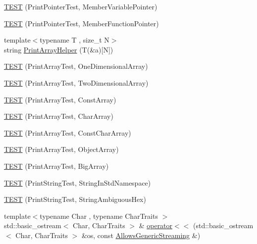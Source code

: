 \begin{DoxyCompactItemize}
\hyperlink{namespacetesting_1_1gtest__printers__test_a434cafcc1dbee409992bbb1593034480}{\-T\-E\-S\-T} (\-Print\-Pointer\-Test, \-Member\-Variable\-Pointer)
\item 
\hyperlink{namespacetesting_1_1gtest__printers__test_a9d998b210890d3d7e085d01c457f650f}{\-T\-E\-S\-T} (\-Print\-Pointer\-Test, \-Member\-Function\-Pointer)
\item 
{\footnotesize template$<$typename T , size\-\_\-t \-N$>$ }\\string \hyperlink{namespacetesting_1_1gtest__printers__test_a10300ded1e327c98c6a36beb7ad49e58}{\-Print\-Array\-Helper} (\-T(\&a)\mbox{[}\-N\mbox{]})
\item 
\hyperlink{namespacetesting_1_1gtest__printers__test_a3845c4717b03cb5ad309c7d9a37acb0a}{\-T\-E\-S\-T} (\-Print\-Array\-Test, \-One\-Dimensional\-Array)
\item 
\hyperlink{namespacetesting_1_1gtest__printers__test_ac366b9ec749b2499d21583d3b8f86273}{\-T\-E\-S\-T} (\-Print\-Array\-Test, \-Two\-Dimensional\-Array)
\item 
\hyperlink{namespacetesting_1_1gtest__printers__test_a8b5638f178c12f58707ca0f02a3b4d41}{\-T\-E\-S\-T} (\-Print\-Array\-Test, \-Const\-Array)
\item 
\hyperlink{namespacetesting_1_1gtest__printers__test_a82441850ddadc324b1a7ab57b4247bc7}{\-T\-E\-S\-T} (\-Print\-Array\-Test, \-Char\-Array)
\item 
\hyperlink{namespacetesting_1_1gtest__printers__test_af8e9c48c5a28dc9e02631f4527b11556}{\-T\-E\-S\-T} (\-Print\-Array\-Test, \-Const\-Char\-Array)
\item 
\hyperlink{namespacetesting_1_1gtest__printers__test_af91d8ad9d6c7547913fe05c7acc44114}{\-T\-E\-S\-T} (\-Print\-Array\-Test, \-Object\-Array)
\item 
\hyperlink{namespacetesting_1_1gtest__printers__test_a596493b56489aa1571fa26d1402e7116}{\-T\-E\-S\-T} (\-Print\-Array\-Test, \-Big\-Array)
\item 
\hyperlink{namespacetesting_1_1gtest__printers__test_abbd355e76033f0defd76c37523ad0f60}{\-T\-E\-S\-T} (\-Print\-String\-Test, \-String\-In\-Std\-Namespace)
\item 
\hyperlink{namespacetesting_1_1gtest__printers__test_ac20ee165500471e363011c3f664d2fb8}{\-T\-E\-S\-T} (\-Print\-String\-Test, \-String\-Ambiguous\-Hex)
\item 
{\footnotesize template$<$typename Char , typename Char\-Traits $>$ }\\std\-::basic\-\_\-ostream$<$ \-Char, \*
\-Char\-Traits $>$ \& \hyperlink{namespacetesting_1_1gtest__printers__test_a1eb0213095e639d357692066e8505887}{operator$<$$<$} (std\-::basic\-\_\-ostream$<$ \-Char, \-Char\-Traits $>$ \&os, const \hyperlink{classtesting_1_1gtest__printers__test_1_1AllowsGenericStreaming}{\-Allows\-Generic\-Streaming} \&)

\end{DoxyCompactItemize}
